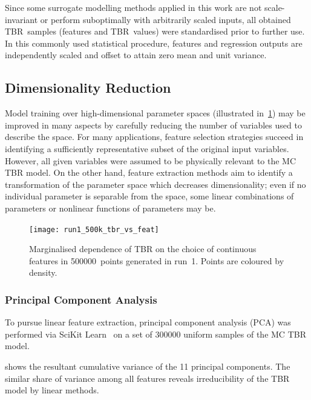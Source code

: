 Since some surrogate modelling methods applied in this work are not scale-invariant or
perform suboptimally with arbitrarily scaled inputs, all obtained TBR~samples
(features and TBR~values) were standardised prior to further use. In this
commonly used statistical procedure, features and regression outputs are
independently scaled and offset to attain zero mean and unit variance.



\subsection{Dimensionality Reduction}
\label{sec:dimred}


Model training over high-dimensional parameter spaces (illustrated
in~\cref{fig:tbr-vs-features}) may be improved in many
aspects by carefully reducing the number of variables used to describe the
space. For many applications, feature selection strategies succeed in
identifying a sufficiently representative subset of the original input
variables. However, all given variables were assumed to be physically relevant
to the MC TBR model. On the other hand, feature extraction methods aim to
identify a transformation of the parameter space which decreases dimensionality; even if no individual parameter is separable from the space, some linear combinations of parameters or nonlinear functions of parameters may be.

\begin{figure}[h]
	\centering
	\texttt{[image: run1\_500k\_tbr\_vs\_feat]}
	\caption{Marginalised dependence of TBR on the choice of continuous
	features in \num{500000}~points generated in run~1. Points are coloured by density.}
  \label{fig:tbr-vs-features}
\end{figure}


\subsubsection{Principal Component Analysis}

To pursue linear feature extraction, principal component analysis (PCA)
\cite{Jolliffe2016} was performed via SciKit Learn~\cite{scikit-learn} on a set
of \num{300000} uniform samples of the MC TBR model. %

 shows the resultant cumulative variance of the 11 principal components. The similar share of variance among all features
reveals irreducibility of the TBR model by linear methods.

